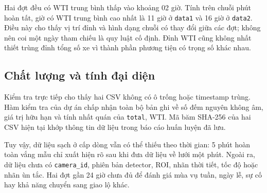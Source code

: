     Hai đợt đều có WTI trung bình thấp vào khoảng 02 giờ. Tính trên chuỗi phút hoàn tất, giờ có WTI trung bình cao nhất là 11 giờ ở \texttt{data1} và 16 giờ ở \texttt{data2}. Điều này cho thấy vị trí đỉnh và hình dạng chuỗi có thay đổi giữa các đợt; không nên coi một ngày tham chiếu là quy luật cố định. Đỉnh WTI cũng không nhất thiết trùng đỉnh tổng số xe vì thành phần phương tiện có trọng số khác nhau.

    
    \subsection{Chất lượng và tính đại diện}
    Kiểm tra trực tiếp cho thấy hai CSV không có ô trống hoặc timestamp trùng. Hàm kiểm tra của dự án chấp nhận toàn bộ bản ghi về số đếm nguyên không âm, giá trị hữu hạn và tính nhất quán của \texttt{total}, WTI. Mã băm SHA-256 của hai CSV hiện tại khớp thông tin dữ liệu trong báo cáo huấn luyện đã lưu.

    Tuy vậy, dữ liệu sạch ở cấp dòng vẫn có thể thiếu theo thời gian: 5 phút hoàn toàn vắng mẫu chỉ xuất hiện rõ sau khi đưa dữ liệu về lưới một phút. Ngoài ra, dữ liệu chưa có \texttt{camera\_id}, phiên bản detector, ROI, nhãn thời tiết, tốc độ hoặc nhãn ùn tắc. Hai đợt gần 24 giờ chưa đủ để đánh giá mùa vụ tuần, ngày lễ, sự cố hay khả năng chuyển sang giao lộ khác.

